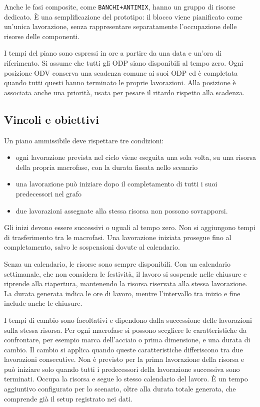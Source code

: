 Anche le fasi composite, come \texttt{BANCHI+ANTIMIX}, hanno un gruppo di risorse dedicato. È una semplificazione del prototipo: il blocco viene pianificato come un'unica lavorazione, senza rappresentare separatamente l'occupazione delle risorse delle componenti.

I tempi del piano sono espressi in ore a partire da una data e un'ora di riferimento. Si assume che tutti gli ODP siano disponibili al tempo zero. Ogni posizione ODV conserva una scadenza comune ai suoi ODP ed è completata quando tutti questi hanno terminato le proprie lavorazioni. Alla posizione è associata anche una priorità, usata per pesare il ritardo rispetto alla scadenza.

\begin{samepage}
\section{Vincoli e obiettivi}
\label{sec:scheduling-constraints-and-objectives}

Un piano ammissibile deve rispettare tre condizioni:
\begin{itemize}
\item ogni lavorazione prevista nel ciclo viene eseguita una sola volta, su una risorsa della propria macrofase, con la durata fissata nello scenario
\item una lavorazione può iniziare dopo il completamento di tutti i suoi predecessori nel grafo
\item due lavorazioni assegnate alla stessa risorsa non possono sovrapporsi.
\end{itemize}
\end{samepage}
Gli inizi devono essere successivi o uguali al tempo zero. Non si aggiungono tempi di trasferimento tra le macrofasi. Una lavorazione iniziata prosegue fino al completamento, salvo le sospensioni dovute al calendario.

Senza un calendario, le risorse sono sempre disponibili. Con un calendario settimanale, che non considera le festività, il lavoro si sospende nelle chiusure e riprende alla riapertura, mantenendo la risorsa riservata alla stessa lavorazione. La durata generata indica le ore di lavoro, mentre l'intervallo tra inizio e fine include anche le chiusure.

I tempi di cambio sono facoltativi e dipendono dalla successione delle lavorazioni sulla stessa risorsa. Per ogni macrofase si possono scegliere le caratteristiche da confrontare, per esempio marca dell'acciaio o prima dimensione, e una durata di cambio. Il cambio si applica quando queste caratteristiche differiscono tra due lavorazioni consecutive. Non è previsto per la prima lavorazione della risorsa e può iniziare solo quando tutti i predecessori della lavorazione successiva sono terminati. Occupa la risorsa e segue lo stesso calendario del lavoro. È un tempo aggiuntivo configurato per lo scenario, oltre alla durata totale generata, che comprende già il setup registrato nei dati.


